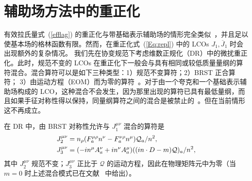 \section{辅助场方法中的重正化}\label{sec:renorm}

有效拉氏量式~(\ref{efflag}) 的重正化与带基础表示辅助场的情形完全类似~\cite{Bagan:1993zv,Ji:2017oey}，并且足以使基本场的格林函数有限。然而，在重正化式~(\ref{Eq:repl}) 中的 LCOs $J_1, {\overline J}_1$ 时会出现额外的复杂情况。
我们先在协变规范下考虑维数正规化（DR）中的微扰重正化。此时，规范不变的 LCOs 在重正化下一般会与具有相同或较低质量量纲的算符混合。混合算符可以是如下三种类型：1）规范不变算符；2）BRST 正合算符；
3）由运动方程（EOM）而为零的算符~\cite{Collins:1984xc}。对于由一个夸克和一个基础表示辅助场构成的 LCO，这种混合不会发生，因为那里出现的算符已具有最低量纲，而且如果手征对称性得以保持，同量纲算符之间的混合是被禁止的~\cite{Chen:2017mie}。但在当前情形这不再成立。

在 DR 中，由 BRST 对称性允许与 $J_1^{\mu\nu}$ 混合的算符是
\begin{align}\label{mixingop}
J_2^{\mu\nu}&=n_{\rho}(F^{\mu\rho}_a n^\nu-F^{\nu\rho}_a n^{\mu}){\mathcal Q}_a/n^2,\nonumber\\
J_3^{\mu\nu}&=(-in^\mu A_a^{\nu}+in^\nu A_a^\mu)((in\cdot D-m) \mathcal Q)_a/n^2,
\end{align}
其中 $J_2^{\mu\nu}$ 规范不变；$J_3^{\mu\nu}$ 正比于 $\mathcal Q$ 的运动方程，因此在物理矩阵元中为零（当 $m=0$ 时上述混合模式已在文献~\cite{Dorn:1981wa} 中给出）。


